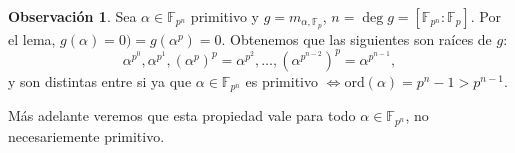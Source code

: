 \documentclass[10pt, spanish]{report}
\theoremstyle{definition}
\newtheorem*{obs}{Observación}
\newcommand{\F}{\mathbb{F}}
\newcommand{\ord}[1]{\text{ord}(#1)}
\newcommand{\fecha}[1]{\marginpar{\underline{#1}}}
\begin{document}
\fecha{18/03}

\begin{obs}
    Sea $\alpha\in\F_{p^n}$ primitivo y $g=m_{\alpha,\F_p}$, $n=\deg{g}=\left[
    \F_{p^n}:\F_p\right]$. Por el lema, $g(\alpha)=0)=g(\alpha^p)=0$. Obtenemos
    que las siguientes son raíces de $g$: \[\alpha^{p^0},\alpha^{p^1},(\alpha^p)^p=
    \alpha^{p^2},\ldots,\left(\alpha^{p^{n-2}}\right)^p=\alpha^{p^{n-1}},\]
    y son distintas entre si ya que $\alpha\in\F_{p^{n}}$ es primitivo
    $\Leftrightarrow \ord{\alpha}=p^n-1>p^{n-1}$. 

    Más adelante veremos que esta propiedad vale para todo $\alpha\in\F_{p^n}$,
    no necesariemente primitivo.
\end{obs}

\end{document}
